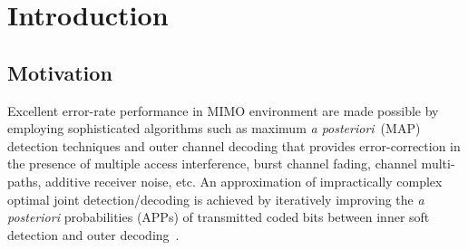 \chapter{Introduction}
\label{ch:Introduction} 


\section{Motivation}
\label{sec:Motivation} Excellent error-rate performance in MIMO
environment are made possible by employing sophisticated algorithms
such as maximum \emph{a posteriori}~(MAP) detection techniques and
outer channel decoding that provides error-correction in the presence
of multiple access interference, burst channel fading, channel
multi-paths, additive receiver noise, etc. An approximation of
impractically complex optimal joint detection/decoding is achieved by
iteratively improving the \emph{a posteriori} probabilities (APPs) of
transmitted coded bits between inner soft detection and outer
decoding~\cite{schutski2017tensor}.
 